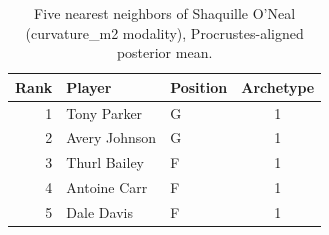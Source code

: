\begin{table}[htbp]
  \centering\small
  \begin{tabular}{rllc}
    \toprule
    Rank & Player & Position & Archetype \\
    \midrule
    1 & Tony Parker & G & 1 \\
    2 & Avery Johnson & G & 1 \\
    3 & Thurl Bailey & F & 1 \\
    4 & Antoine Carr & F & 1 \\
    5 & Dale Davis & F & 1 \\
    \bottomrule
  \end{tabular}
  \caption{Five nearest neighbors of Shaquille O'Neal (curvature_m2 modality), Procrustes-aligned posterior mean.}
  \label{tab:Shaquille_O_Neal_neighbors_curvature_m2}
\end{table}


